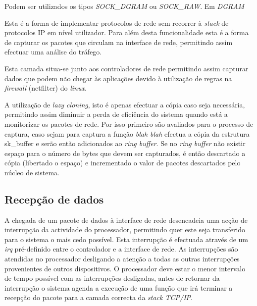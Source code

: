  Podem ser utilizados os tipos \textit{SOCK\_DGRAM} ou \textit{SOCK\_RAW}. Em \textit{DGRAM}
 

 Esta é a forma de implementar protocolos de rede sem recorrer à \textit{stack} de protocolos IP em nível utilizador.
 Para além desta funcionalidade esta é a forma de capturar os pacotes que circulam na interface de rede, permitindo assim efectuar uma análise do tráfego.

 Esta camada situa-se junto aos controladores de rede permitindo assim capturar dados que podem não chegar às aplicações devido à utilização de regras na \textit{firewall} (netfilter) do \textit{linux}.

 A utilização de \textit{lazy cloning}, isto é apenas efectuar a cópia caso seja necessária, permitindo assim diminuir a perda de eficiência do sistema quando está a monitorizar os pacotes de rede.
 Por isso primeiro são avaliados para o processo de captura, caso sejam para captura a função \textit{blah blah} efectua a cópia da estrutura sk\_buffer e serão então adicionados ao \textit{ring buffer}.
 Se no \textit{ring buffer} não existir espaço para o número de bytes que devem ser capturados, é então descartado a cópia (libertado o espaço) e incrementado o valor de pacotes descartados pelo núcleo de sistema.

\subsection{Recepção de dados}

A chegada de um pacote de dados à interface de rede desencadeia uma acção de interrupção da actividade do processador, permitindo quer este seja transferido para o sistema o mais cedo possível. Esta interrupção é efectuada através de um \textit{irq} pré-definido entre o controlador e a interface de rede. As interrupções são atendidas no processador desligando a atenção a todas as outras interrupções provenientes de outros dispositivos. %
O processador deve estar o menor intervalo de tempo possível com as interrupções desligadas, antes de retornar da interrupção o sistema agenda a execução de uma função que irá terminar a recepção do pacote para a camada correcta da \textit{stack TCP/IP}.%

